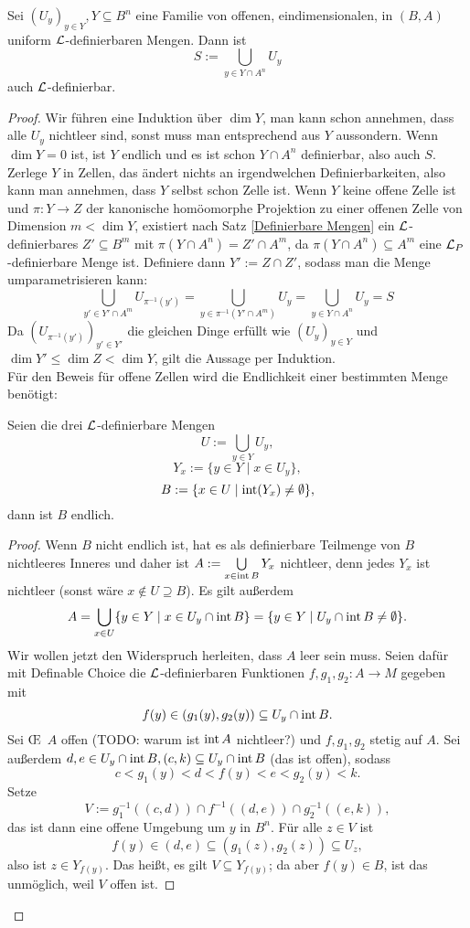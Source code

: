 \begin{lemma}
	Sei $(U_y)_{y\in Y}, Y\subseteq B^n$ eine Familie von offenen, eindimensionalen, in $(B,A)$ uniform $\mathcal{L}$-definierbaren Mengen. Dann ist $$S:=\bigcup\limits_{y\in Y\cap A^n}U_y$$ auch $\mathcal{L}$-definierbar.
\end{lemma}
\begin{proof}
	Wir führen eine Induktion über $\dim Y$, man kann schon annehmen, dass alle $U_y$ nichtleer sind, sonst muss man entsprechend aus $Y$ aussondern. Wenn $\dim Y=0$ ist, ist $Y$ endlich und es ist schon $Y\cap A^n$ definierbar, also auch $S$.\\
	Zerlege $Y$ in Zellen, das ändert nichts an irgendwelchen Definierbarkeiten, also kann man annehmen, dass $Y$ selbst schon Zelle ist. Wenn $Y$ keine offene Zelle ist und $\pi:Y\rightarrow Z$ der kanonische homöomorphe Projektion zu einer offenen Zelle von Dimension $m<\dim Y$, existiert nach Satz \ref{Definierbare Mengen} ein $\mathcal{L}$-definierbares $Z'\subseteq B^m$ mit $\pi(Y\cap A^n)=Z'\cap A^m$, da $\pi(Y\cap A^n)\subseteq A^m$ eine $\mathcal{L}_P$-definierbare Menge ist. Definiere dann $Y':=Z\cap Z'$, sodass man die Menge umparametrisieren kann:
	$$\bigcup\limits_{y'\in Y'\cap A^m}U_{\pi^{-1}(y')}=\bigcup\limits_{y\in\pi^{-1}(Y'\cap A^m)}U_y=\bigcup\limits_{y\in Y\cap A^n}U_y=S$$
	Da $(U_{\pi^{-1}(y')})_{y'\in Y'}$ die gleichen Dinge erfüllt wie $(U_y)_{y\in Y}$ und $\dim Y'\leq\dim Z<\dim Y$, gilt die Aussage per Induktion.\\
	Für den Beweis für offene Zellen wird die Endlichkeit einer bestimmten Menge benötigt:
	
	\begin{lemma}
		Seien die drei $\mathcal{L}$-definierbare Mengen $$U:=\bigcup\limits_{y\in Y}U_y,$$ $$Y_x:=\{y\in Y\mid x\in U_y\},$$ $$B:=\{x\in U\mid\operatorname{int}(Y_x)\neq\emptyset\},$$ dann ist $B$ endlich.
	\end{lemma}
	\begin{proof}
		Wenn $B$ nicht endlich ist, hat es als definierbare Teilmenge von $B$ nichtleeres Inneres und daher ist $A:=\bigcup\limits_{x\in\operatorname{int} B}Y_x$ nichtleer, denn jedes $Y_x$ ist nichtleer (sonst wäre $x\notin U\supseteq B$). Es gilt außerdem $$A=\bigcup\limits_{x\in U}\{y\in Y\mid x\in U_y\cap\operatorname{int} B\}=\{y\in Y\mid U_y\cap\operatorname{int} B\neq\emptyset\}.$$
		Wir wollen jetzt den Widerspruch herleiten, dass $A$ leer sein muss. Seien dafür mit Definable Choice die $\mathcal{L}$-definierbaren Funktionen $f,g_1,g_2:A\rightarrow M$ gegeben mit $$f(y)\in(g_1(y),g_2(y))\subseteq U_y\cap\operatorname{int} B.$$
		Sei \OE\ $A$ offen (TODO: warum ist $\operatorname{int} A$ nichtleer?) und $f,g_1,g_2$ stetig auf $A$. Sei außerdem $d,e\in U_y\cap\operatorname{int} B, (c,k)\subseteq U_y\cap\operatorname{int} B$ (das ist offen), sodass $$c<g_1(y)<d<f(y)<e<g_2(y)<k.$$ Setze $$V:=g_1^{-1}((c,d))\cap f^{-1}((d,e))\cap g_2^{-1}((e,k)),$$ das ist dann eine offene Umgebung um $y$ in $B^n$. Für alle $z\in V$ ist $$f(y)\in(d,e)\subseteq(g_1(z),g_2(z))\subseteq U_z,$$ also ist $z\in Y_{f(y)}$. Das heißt, es gilt $V\subseteq Y_{f(y)}$; da aber $f(y)\in B$, ist das unmöglich, weil $V$ offen ist.
	\end{proof}
	

\end{proof}
